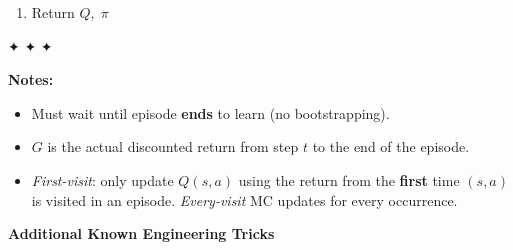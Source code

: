 \documentclass[11pt]{article}
\providecommand{\tightlist}{%
      \setlength{\itemsep}{0pt}\setlength{\parskip}{0pt}}
\begin{document}
\begin{enumerate}
\def\labelenumi{\arabic{enumi}.}
\setcounter{enumi}{2}
\tightlist
\item
  Return \(Q,\; \pi\)
\end{enumerate}

✦ ✦ ✦

\textbf{Notes:}

\begin{itemize}
\tightlist
\item
  Must wait until episode \textbf{ends} to learn (no bootstrapping).
\item
  \(G\) is the actual discounted return from step \(t\) to the end of
  the episode.
\item
  \emph{First-visit}: only update \(Q(s,a)\) using the return from the
  \textbf{first} time \((s,a)\) is visited in an episode.
  \emph{Every-visit} MC updates for every occurrence.
\end{itemize}

    \label{tricks-2-1}

    \textbf{Additional Known Engineering Tricks}
\end{document}
